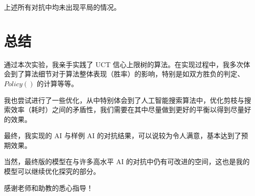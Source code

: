 \documentclass[a4paper]{article}
\begin{document}
    上述所有对抗中均未出现平局的情况。

    \section{总结}

    通过本次实验，我亲手实践了 UCT 信心上限树的算法。在实现过程中，我多次体会到了算法细节对于算法整体表现（胜率）的影响，特别是如双方胜负的判定、$Policy()$ 的计算等等。

    我也尝试进行了一些优化，从中特别体会到了人工智能搜索算法中，优化剪枝与搜索效率（耗时）之间的矛盾性，我们需要在其中尽量做到更好的平衡以得到尽量好的效果。

    最终，我实现的 AI 与样例 AI 的对抗结果，可以说较为令人满意，基本达到了预期效果。

    当然，最终版的模型在与许多高水平 AI 的对抗中仍有可改进的空间，这也是我的模型可以继续优化探究的部分。

    感谢老师和助教的悉心指导！
\end{document}
